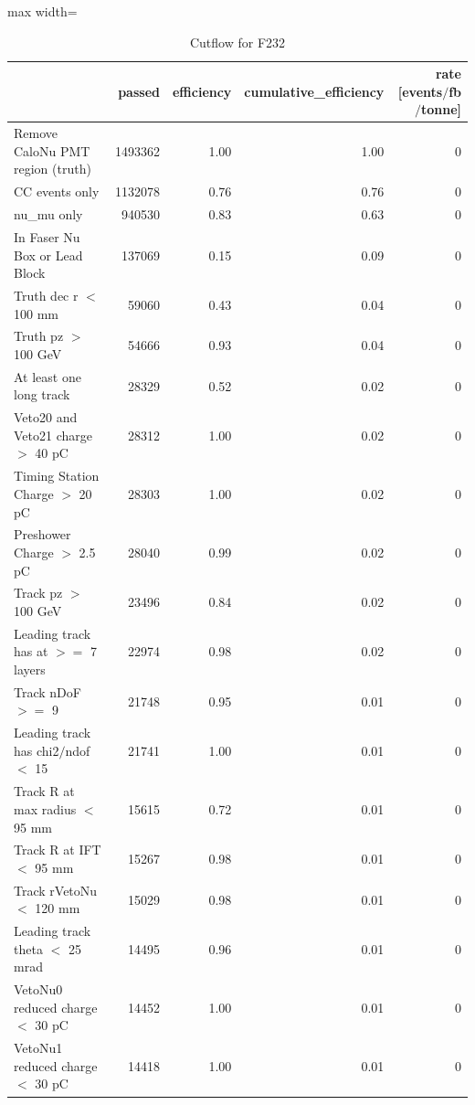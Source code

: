 \documentclass{article}
\begin{document}
\begin{table}
\centering
\caption{Cutflow for F232}
\begin{adjustbox}{max width=\textwidth}
\begin{tabular}{lrrrr}
\toprule
 & passed & efficiency & cumulative\_efficiency & rate [events$/$fb$/$tonne] \\
\midrule
Remove CaloNu PMT region (truth) & 1493362 & 1.00 & 1.00 & 0 \\
CC events only & 1132078 & 0.76 & 0.76 & 0 \\
nu\_mu only & 940530 & 0.83 & 0.63 & 0 \\
In Faser Nu Box or Lead Block & 137069 & 0.15 & 0.09 & 0 \\
Truth dec r $<$ 100 mm & 59060 & 0.43 & 0.04 & 0 \\
Truth pz $>$ 100 GeV & 54666 & 0.93 & 0.04 & 0 \\
At least one long track & 28329 & 0.52 & 0.02 & 0 \\
Veto20 and Veto21 charge $>$ 40 pC & 28312 & 1.00 & 0.02 & 0 \\
Timing Station Charge $>$ 20 pC & 28303 & 1.00 & 0.02 & 0 \\
Preshower Charge $>$ 2.5 pC & 28040 & 0.99 & 0.02 & 0 \\
Track pz $>$ 100 GeV & 23496 & 0.84 & 0.02 & 0 \\
Leading track has at $>$$=$ 7 layers & 22974 & 0.98 & 0.02 & 0 \\
Track nDoF $>$$=$ 9 & 21748 & 0.95 & 0.01 & 0 \\
Leading track has chi2$/$ndof $<$ 15 & 21741 & 1.00 & 0.01 & 0 \\
Track R at max radius $<$ 95 mm & 15615 & 0.72 & 0.01 & 0 \\
Track R at IFT $<$ 95 mm & 15267 & 0.98 & 0.01 & 0 \\
Track rVetoNu $<$ 120 mm & 15029 & 0.98 & 0.01 & 0 \\
Leading track theta $<$ 25 mrad & 14495 & 0.96 & 0.01 & 0 \\
VetoNu0 reduced charge $<$ 30 pC & 14452 & 1.00 & 0.01 & 0 \\
VetoNu1 reduced charge $<$ 30 pC & 14418 & 1.00 & 0.01 & 0 \\
\bottomrule
\end{tabular}

\end{adjustbox}
\end{table}
\end{document}
